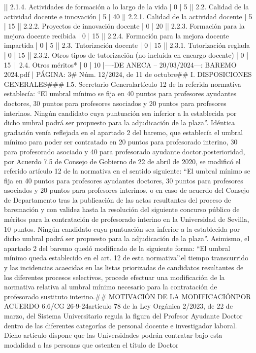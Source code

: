 \documentclass{article}
\begin{document}
\begin{itemize}
{{{{{{{   |\n| 2.1.4. Actividades de formación a lo largo de la vida     | 0             | 5             |\n| 2.2. Calidad de la actividad docente e innovación          | 5             | 40            |\n| 2.2.1. Calidad de la actividad docente                     | 5             | 15            |\n| 2.2.2. Proyectos de innovación docente                     | 0             | 20            |\n| 2.2.3. Formación para la mejora docente recibida           | 0             | 15            |\n| 2.2.4. Formación para la mejora docente impartida          | 0             | 5             |\n| 2.3. Tutorización docente                                  | 0             | 15            |\n| 2.3.1. Tutorización reglada                                | 0             | 15            |\n| 2.3.2. Otros tipos de tutorización (no incluida en encargo docente) | 0             | 15            |\n| 2.4. Otros méritos*                                       | 0             | 10            |\n\n----\n{} DE ANECA – 20/03/2024\n\n---\n\nFUENTE: BAREMO 2024.pdf | PÁGINA: 3\n# Núm. 12/2024, de 11 de octubre\n\n## I. DISPOSICIONES GENERALES\n\n### I.5. Secretario General\n\nEl artículo 12 de la referida normativa establecía: “El umbral mínimo se fija en 40 puntos para profesores ayudantes doctores, 30 puntos para profesores asociados y 20 puntos para profesores interinos. Ningún candidato cuya puntuación sea inferior a la establecida por dicho umbral podrá ser propuesto para la adjudicación de la plaza”. Idéntica gradación venía reflejada en el apartado 2 del baremo, que establecía el umbral mínimo para poder ser contratado en 20 puntos para profesorado interino, 30 para profesorado asociado y 40 para profesorado ayudante doctor.\n\nCon posterioridad, por Acuerdo 7.5 de Consejo de Gobierno de 22 de abril de 2020, se modificó el referido artículo 12 de la normativa en el sentido siguiente: “El umbral mínimo se fija en 40 puntos para profesores ayudantes doctores, 30 puntos para profesores asociados y 20 puntos para profesores interinos, o en caso de acuerdo del Consejo de Departamento tras la publicación de las actas resultantes del proceso de baremación y con validez hasta la resolución del siguiente concurso público de méritos para la contratación de profesorado interino en la Universidad de Sevilla, 10 puntos. Ningún candidato cuya puntuación sea inferior a la establecida por dicho umbral podrá ser propuesto para la adjudicación de la plaza”. Asimismo, el apartado 2 del baremo quedó modificado de la siguiente forma: “El umbral mínimo queda establecido en el art. 12 de esta normativa”.\n\nDado el tiempo transcurrido y las incidencias acaecidas en las listas priorizadas de candidatos resultantes de los diferentes procesos selectivos, procede efectuar una modificación de la normativa relativa al umbral mínimo necesario para la contratación de profesorado sustituto interino.\n\n## MOTIVACIÓN DE LA MODIFICACIÓN\n\nAPROBADA POR ACUERDO 6.6/CG 26-9-24\n\nEl artículo 78 de la Ley Orgánica 2/2023, de 22 de marzo, del Sistema Universitario regula la figura del Profesor Ayudante Doctor dentro de las diferentes categorías de personal docente e investigador laboral. Dicho artículo dispone que las Universidades podrán contratar bajo esta modalidad a las personas que ostenten el título de Doctor }}}}}}}
\end{itemize}
\end{document}
